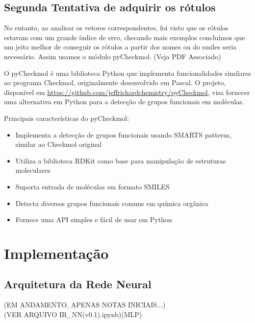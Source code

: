 \documentclass[11pt,a4paper]{article}
\begin{document}


\subsection{Segunda Tentativa de adquirir os rótulos}

No entanto, ao analisar os vetores correspondentes, foi visto que os rótulos estavam com um grande índice de erro, checando mais exemplos concluímos que um jeito melhor de conseguir os rótulos a partir dos nomes ou do smiles seria necessário. Assim usamos o módulo pyCheckmol. (Veja PDF Associado)


O pyCheckmol é uma biblioteca Python que implementa funcionalidades similares ao programa Checkmol, originalmente desenvolvido em Pascal. O projeto, disponível em \url{https://github.com/jeffrichardchemistry/pyCheckmol}, visa fornecer uma alternativa em Python para a detecção de grupos funcionais em moléculas.

Principais características do pyCheckmol:

\begin{itemize}
    \item Implementa a detecção de grupos funcionais usando SMARTS patterns, similar ao Checkmol original
    \item Utiliza a biblioteca RDKit como base para manipulação de estruturas moleculares
    \item Suporta entrada de moléculas em formato SMILES
    \item Detecta diversos grupos funcionais comuns em química orgânica
    \item Fornece uma API simples e fácil de usar em Python
\end{itemize}


\section{Implementação}

\subsection{Arquitetura da Rede Neural}

{\color{red}(EM ANDAMENTO, APENAS NOTAS INICIAIS...)}\\
{\color{red}(VER ARQUIVO IR\_NN(v0.1).ipynb)(MLP)}
\end{document}

